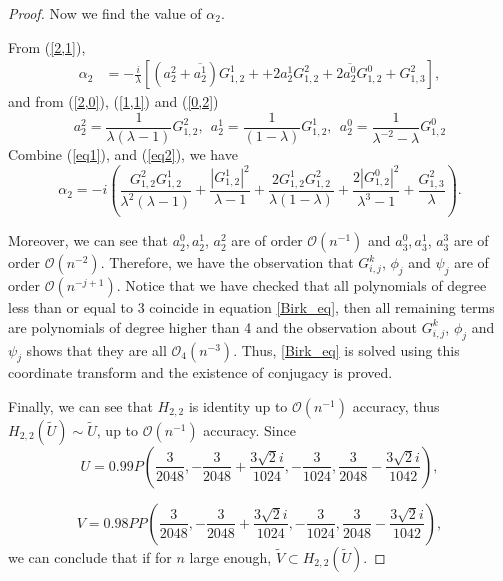 \documentclass[10pt,a4paper]{amsart}
\begin{document}
\begin{proof}
Now we find the value of $\alpha_2$.

From (\ref{2,1}),
\begin{align}\label{eq1}
\alpha_{2} &= -\frac{i}{\lambda}\left\lbrack \left( a_{2}^{2} + \overline{a_{2}^{1}} \right)G_{1,2}^{1}++2a_2^1G_{1,2}^2+2\overline{a_2^0}G_{1,2}^0  + G_{1,3}^{2} \right\rbrack,
\end{align}
and from (\ref{2,0}), (\ref{1,1}) and (\ref{0,2})
\begin{equation}\label{eq2}
 a_{2}^{2}=\frac{1}{\lambda( \lambda-1)}G_{1,2}^{2},\ \  a_{2}^{1}=\frac{1}{(1 - \lambda)}G_{1,2}^{1},\ \  a_{2}^{0}=\frac{1}{\lambda^{-2}-\lambda}G_{1,2}^{0}
\end{equation}
Combine (\ref{eq1}), and (\ref{eq2}), we have
\begin{equation}\label{alpha2}
\alpha_{2} = -i\left( \frac{G_{1,2}^{2}G_{1,2}^{1}}{\lambda^2( \lambda-1)} + \frac{\left|{G_{1,2}^{1}}\right|^{2}}{\lambda-1 } +\frac{2G_{1,2}^1G_{1,2}^2}{\lambda(1-\lambda)}+\frac{2\left|{G_{1,2}^{0}}\right|^{2}}{\lambda^3-1}+ \frac{G_{1,3}^{2}}{\lambda} \right).
\end{equation}

Moreover, we can see that $a_2^0,a_2^1$, $a_2^2$ are of order $\mathcal{O}(n^{-1})$ and $a_3^0,a_3^1$, $a_3^3$ are of order $\mathcal{O}(n^{-2})$. 
Therefore, we have the observation that $G_{i,j}^k$, $\phi_j$ and $\psi_j$ are of order $\mathcal{O}(n^{-j+1})$. Notice that we have checked that all polynomials of degree less than or equal to 3 coincide in equation \ref{Birk_eq}, then all remaining terms are polynomials of degree higher than 4 and the observation about $G_{i,j}^k$, $\phi_j$ and $\psi_j$ shows that they are all $\mathcal{O}_4\left(n^{-3}\right)$.
Thus, \ref{Birk_eq} is solved using this coordinate transform and the existence of conjugacy is proved.

Finally, we can see that $H_{2,2}$ is identity up to $\mathcal{O}(n^{-1})$ accuracy, thus $H_{2,2}(\widetilde{U})\sim \widetilde{U}$, up to $\mathcal{O}(n^{-1})$ accuracy. Since 
$$U=0.99P\left(	\frac{3}{2048},  -\frac{3}{2048}+\frac{3\sqrt{2}i}{1024}, -\frac{3}{1024},  \frac{3}{2048}-\frac{3\sqrt{2}i}{1042}\right),$$

$$V=0.98PP\left(	\frac{3}{2048},  -\frac{3}{2048}+\frac{3\sqrt{2}i}{1024}, -\frac{3}{1024},  \frac{3}{2048}-\frac{3\sqrt{2}i}{1042}\right),$$
we can conclude that if for $n$ large enough, $\widetilde{V}\subset H_{2,2}(\widetilde{U})$.

\end{proof}
\end{document}

